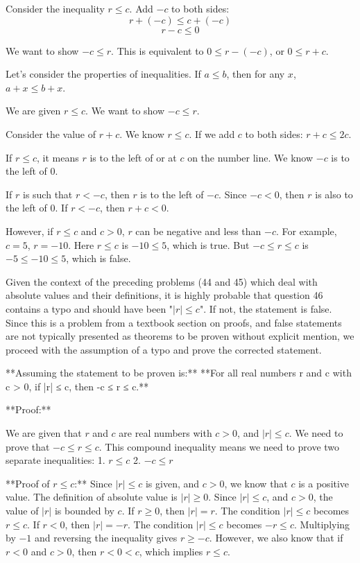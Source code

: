 \documentclass{article}
\begin{document}
Consider the inequality $r \le c$.
Add $-c$ to both sides:
$$ r + (-c) \le c + (-c) $$
$$ r - c \le 0 $$

We want to show $-c \le r$.
This is equivalent to $0 \le r - (-c)$, or $0 \le r+c$.

Let's consider the properties of inequalities.
If $a \le b$, then for any $x$, $a+x \le b+x$.

We are given $r \le c$.
We want to show $-c \le r$.

Consider the value of $r+c$.
We know $r \le c$.
If we add $c$ to both sides: $r+c \le 2c$.

If $r \le c$, it means $r$ is to the left of or at $c$ on the number line.
We know $-c$ is to the left of $0$.

If $r$ is such that $r < -c$, then $r$ is to the left of $-c$.
Since $-c < 0$, then $r$ is also to the left of $0$.
If $r < -c$, then $r+c < 0$.

However, if $r \le c$ and $c>0$, $r$ can be negative and less than $-c$. For example, $c=5$, $r=-10$.
Here $r \le c$ is $-10 \le 5$, which is true.
But $-c \le r \le c$ is $-5 \le -10 \le 5$, which is false.

Given the context of the preceding problems (44 and 45) which deal with absolute values and their definitions, it is highly probable that question 46 contains a typo and should have been "$|r| \le c$". If not, the statement is false. Since this is a problem from a textbook section on proofs, and false statements are not typically presented as theorems to be proven without explicit mention, we proceed with the assumption of a typo and prove the corrected statement.

**Assuming the statement to be proven is:**
**For all real numbers r and c with c > 0, if |r| ≤ c, then -c ≤ r ≤ c.**

**Proof:**

We are given that $r$ and $c$ are real numbers with $c > 0$, and $|r| \le c$.
We need to prove that $-c \le r \le c$.
This compound inequality means we need to prove two separate inequalities:
1. $r \le c$
2. $-c \le r$

**Proof of $r \le c$:**
Since $|r| \le c$ is given, and $c > 0$, we know that $c$ is a positive value.
The definition of absolute value is $|r| \ge 0$.
Since $|r| \le c$, and $c > 0$, the value of $|r|$ is bounded by $c$.
If $r \ge 0$, then $|r| = r$. The condition $|r| \le c$ becomes $r \le c$.
If $r < 0$, then $|r| = -r$. The condition $|r| \le c$ becomes $-r \le c$. Multiplying by $-1$ and reversing the inequality gives $r \ge -c$.
However, we also know that if $r < 0$ and $c > 0$, then $r < 0 < c$, which implies $r \le c$.
\end{document}
